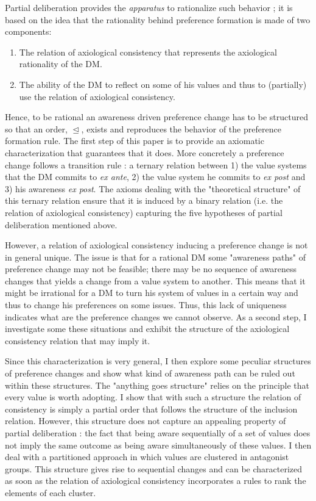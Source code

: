 \documentclass[11pt]{article}
\begin{document}
Partial deliberation provides the \textit{apparatus} to rationalize such behavior ; it is based on the idea that the rationality behind preference formation is made of two components:
\begin{enumerate}
\item The relation of axiological consistency that represents the axiological rationality of the DM.
\item The ability of the DM to reflect on some of his values and thus to (partially) use the relation of axiological consistency.
\end{enumerate}
 Hence, to be rational an awareness driven preference change has to be structured so that an order, $\trianglelefteq$, exists and reproduces the behavior of the preference formation rule. The first step of this paper is to provide an axiomatic characterization that guarantees that it does. More concretely a preference change follows a transition rule : a ternary relation between 1) the value systems that the DM commits to \textit{ex ante}, 2) the value system he commits to \textit{ex post} and 3) his awareness \textit{ex post}. The axioms dealing with the "theoretical structure" of this ternary relation ensure that it is induced by a binary relation (i.e. the relation of axiological consistency) capturing the five hypotheses of partial deliberation mentioned above. 


However, a relation of axiological consistency inducing a preference change is not in general unique. The issue is that for a rational DM some "awareness paths" of preference change may not be feasible; there may be no sequence of awareness changes that yields a change from a value system to another. This means that it might be irrational for a DM to turn his system of values in a certain way and thus to change his preferences on some issues. Thus, this lack of uniqueness indicates what are the preference changes we cannot observe.  As a second step, I investigate some these situations and exhibit the structure of the axiological consistency relation that may imply it. 

Since this characterization is very general, I then explore some peculiar structures of preference changes and show what kind of awareness path can be ruled out within these structures. The "anything goes structure" relies on the principle that every value is worth adopting. I show that with such a structure the relation of consistency is simply a partial order that follows the structure of the inclusion relation. However, this structure does not capture an appealing property of partial deliberation : the fact that being aware sequentially of a set of values does not imply the same outcome as being aware simultaneously of these values. I then deal with a partitioned approach in which values are clustered in antagonist groups. This structure gives rise to sequential changes and can be characterized as soon as the relation of axiological consistency incorporates a rules to rank the elements of each cluster.
\end{document}
